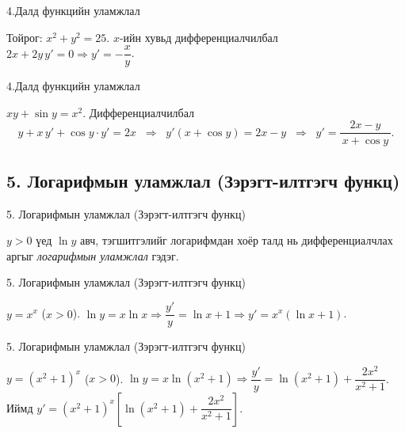 \begin{frame}[allowframebreaks]{4.Далд функцийн уламжлал}
\begin{example}
Тойрог: $x^2+y^2=25$. $x$-ийн хувьд дифференциалчилбал $2x+2y\,y'=0 \Rightarrow y'=-\dfrac{x}{y}$.
\end{example}
\end{frame}

\begin{frame}[allowframebreaks]{4.Далд функцийн уламжлал}
\begin{example}
$xy+\sin y = x^2$. Дифференциалчилбал
\[
y + x\,y' + \cos y \cdot y' = 2x 
\;\;\Rightarrow\;\;
y'(x+\cos y)=2x-y
\;\;\Rightarrow\;\;
\boxed{y'=\dfrac{2x-y}{\,x+\cos y\,}}.
\]
\end{example}
\end{frame}

\subsection*{5. Логарифмын уламжлал (Зэрэгт-илтгэгч функц)}
\begin{frame}[allowframebreaks]{5. Логарифмын уламжлал (Зэрэгт-илтгэгч функц)}
\begin{remark}
$y>0$ үед $\ln y$ авч, тэгшитгэлийг логарифмдан хоёр талд нь дифференциалчлах аргыг \emph{логарифмын уламжлал} гэдэг.
\end{remark}
\end{frame}

\begin{frame}[allowframebreaks]{5. Логарифмын уламжлал (Зэрэгт-илтгэгч функц)}
\begin{example}
$y=x^x$ ($x>0$). $\ln y = x\ln x \Rightarrow \dfrac{y'}{y}=\ln x + 1 \Rightarrow \boxed{y'=x^x(\ln x + 1)}$.
\end{example}
\end{frame}

\begin{frame}[allowframebreaks]{5. Логарифмын уламжлал (Зэрэгт-илтгэгч функц)}
\begin{example}
$y=(x^2+1)^x$ ($x>0$). $\ln y = x\ln(x^2+1)\Rightarrow \dfrac{y'}{y}=\ln(x^2+1)+\dfrac{2x^2}{x^2+1}$.\\
Иймд $\boxed{y'=(x^2+1)^x\!\left[\ln(x^2+1)+\dfrac{2x^2}{x^2+1}\right]}$.
\end{example}
\end{frame}

